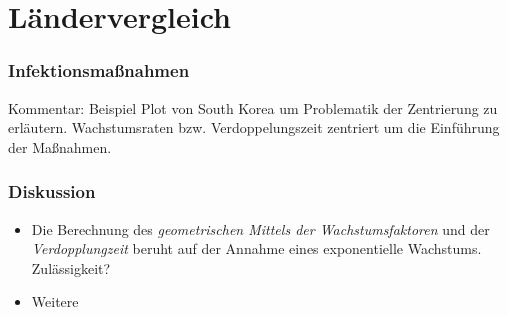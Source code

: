 \documentclass{beamer}
\begin{document}
 \section{Ländervergleich}
\begin{frame}
\frametitle{Infektionsmaßnahmen}
	Kommentar: Beispiel Plot von South Korea um Problematik der Zentrierung zu erläutern. Wachstumsraten bzw. Verdoppelungszeit zentriert um die Einführung der Maßnahmen.
\end{frame}

\begin{frame}
\frametitle{Diskussion}
	\begin{itemize}
		\item Die Berechnung des \emph{geometrischen Mittels der Wachstumsfaktoren} und der \emph{Verdopplungzeit} beruht auf der Annahme eines exponentielle Wachstums. Zulässigkeit?
		\item Weitere
	\end{itemize}
\end{frame}
 
\end{document}
